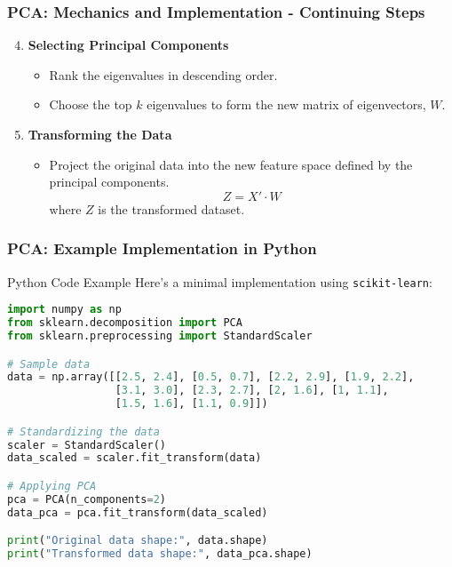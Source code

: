 \documentclass[aspectratio=169]{beamer}
\begin{document}
\begin{frame}[fragile]
    \frametitle{PCA: Mechanics and Implementation - Continuing Steps}
    \begin{enumerate}
        \setcounter{enumi}{3} %
        \item \textbf{Selecting Principal Components}
            \begin{itemize}
                \item Rank the eigenvalues in descending order.
                \item Choose the top \(k\) eigenvalues to form the new matrix of eigenvectors, \(W\).
            \end{itemize}

        \item \textbf{Transforming the Data}
            \begin{itemize}
                \item Project the original data into the new feature space defined by the principal components.
                \begin{equation}
                    Z = X' \cdot W
                \end{equation}
                where \(Z\) is the transformed dataset.
            \end{itemize}
    \end{enumerate}
\end{frame}

\begin{frame}[fragile]
    \frametitle{PCA: Example Implementation in Python}
    \begin{block}{Python Code Example}
        Here’s a minimal implementation using \texttt{scikit-learn}:
        \begin{lstlisting}[language=Python]
import numpy as np
from sklearn.decomposition import PCA
from sklearn.preprocessing import StandardScaler

# Sample data
data = np.array([[2.5, 2.4], [0.5, 0.7], [2.2, 2.9], [1.9, 2.2], 
                 [3.1, 3.0], [2.3, 2.7], [2, 1.6], [1, 1.1], 
                 [1.5, 1.6], [1.1, 0.9]])

# Standardizing the data
scaler = StandardScaler()
data_scaled = scaler.fit_transform(data)

# Applying PCA
pca = PCA(n_components=2)
data_pca = pca.fit_transform(data_scaled)

print("Original data shape:", data.shape)
print("Transformed data shape:", data_pca.shape)
        \end{lstlisting}
    \end{block}
\end{frame}
\end{document}
